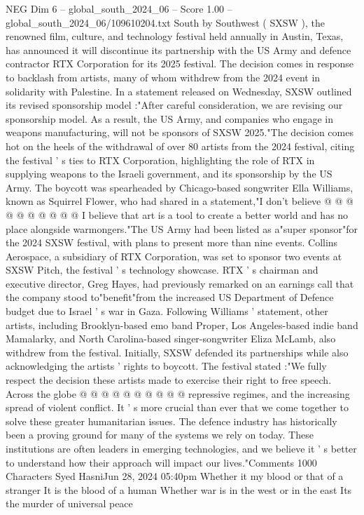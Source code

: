 \begin{textsample}{NEG Dim 6 – global\_south\_2024\_06 – Score 1.00 – global\_south\_2024\_06/109610204.txt}  \label{ex:f6_neg_271}
South by Southwest ( SXSW ), the renowned film, culture, and technology festival held annually in Austin, Texas, has announced it will discontinue its partnership with the US Army and defence contractor RTX Corporation for its 2025 festival.
The decision comes in response to backlash from artists, many of whom withdrew from the 2024 event in solidarity with Palestine.
In a statement released on Wednesday, SXSW outlined its revised sponsorship model :"After careful consideration, we are revising our sponsorship model.
As a result, the US Army, and companies who engage in weapons manufacturing, will not be sponsors of SXSW 2025."The decision comes hot on the heels of the withdrawal of over 80 artists from the 2024 festival, citing the festival ' s ties to RTX Corporation, highlighting the role of RTX in supplying weapons to the Israeli government, and its sponsorship by the US Army.
The boycott was spearheaded by Chicago-based songwriter Ella Williams, known as Squirrel Flower, who had shared in a statement,"I don't believe @ @ @ @ @ @ @ @ @ @ I believe that art is a tool to create a better world and has no place alongside warmongers."The US Army had been listed as a"super sponsor"for the 2024 SXSW festival, with plans to present more than nine events.
Collins Aerospace, a subsidiary of RTX Corporation, was set to sponsor two events at SXSW Pitch, the festival ' s technology showcase.
RTX ' s chairman and executive director, Greg Hayes, had previously remarked on an earnings call that the company stood to"benefit"from the increased US Department of Defence budget due to Israel ' s war in Gaza.
Following Williams ' statement, other artists, including Brooklyn-based emo band Proper, Los Angeles-based indie band Mamalarky, and North Carolina-based singer-songwriter Eliza McLamb, also withdrew from the festival.
Initially, SXSW defended its partnerships while also acknowledging the artists ' rights to boycott.
The festival stated :"We fully respect the decision these artists made to exercise their right to free speech.
Across the globe @ @ @ @ @ @ @ @ @ @ repressive regimes, and the increasing spread of violent conflict.
It ' s more crucial than ever that we come together to solve these greater humanitarian issues.
The defence industry has historically been a proving ground for many of the systems we rely on today.
These institutions are often leaders in emerging technologies, and we believe it ' s better to understand how their approach will impact our lives."Comments 1000 Characters Syed HasniJun 28, 2024 05:40pm Whether it my blood or that of a stranger It is the blood of a human Whether war is in the west or in the east Its the murder of universal peace

\end{textsample}

